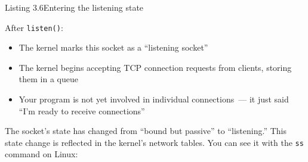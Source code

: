 \begin{codeboxcap}[short]{\textcolor{accent}{Listing 3.6}\enspace Entering the listening state}

\begin{Shaded}
\begin{Highlighting}[]

\OperatorTok{=}
\NormalTok{)}
\NormalTok{, }\NormalTok{))}

\NormalTok{)}

\NormalTok{(}\NormalTok{)}
\end{Highlighting}
\end{Shaded}

\end{codeboxcap}

\noindent{}After \texttt{listen()}:

\begin{itemize}
\tightlist
\item
  The kernel marks this socket as a ``listening socket''
\item
  The kernel begins accepting TCP connection requests from clients, storing them in a queue
\item
  Your program is not yet involved in individual connections~--- it just said ``I'm ready to receive connections''
\end{itemize}

\noindent{}The socket's state has changed from ``bound but passive'' to ``listening.'' This state change is reflected in the kernel's network tables. You can see it with the \texttt{ss} command on Linux:

\begin{codebox}[short]

\begin{Shaded}
\begin{Highlighting}[]
 
\end{Highlighting}
\end{Shaded}

\end{codebox}

